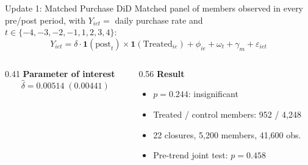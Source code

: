 \documentclass[aspectratio=169]{beamer}  %
\begin{document}
\begin{frame}{Update 1: Matched Purchase DiD}
Matched panel of members observed in every pre/post period, with
$Y_{iet}=$ daily purchase rate and $t \in \{-4,-3,-2,-1,1,2,3,4\}$:
\begingroup
\small
\[
Y_{iet} =
\delta \cdot \mathbf{1}(\text{post}_{t}) \times \mathbf{1}(\text{Treated}_{ie})
+ \phi_{ie} + \omega_t + \gamma_m + \varepsilon_{iet}
\]
\endgroup

\begin{columns}[T]
\begin{column}{0.41\linewidth}
\textbf{Parameter of interest}
\[
\hat{\delta} = 0.00514 \; (0.00441)
\]
\end{column}
\begin{column}{0.56\linewidth}
\textbf{Result}
\begin{itemize}
    \item $p=0.244$: insignificant
    \item Treated / control members: 952 / 4,248
    \item 22 closures, 5,200 members, 41,600 obs.
    \item Pre-trend joint test: $p=0.458$
\end{itemize}
\end{column}
\end{columns}
\end{frame}
\end{document}
